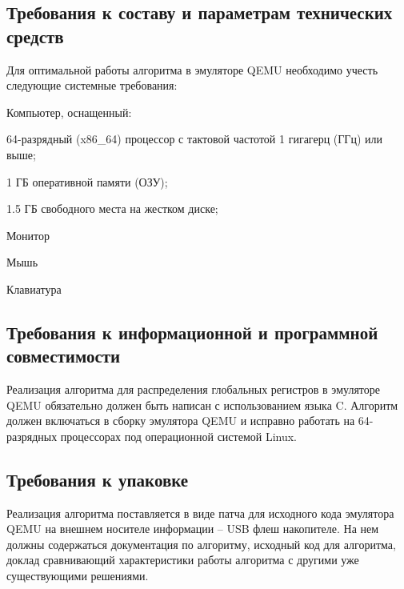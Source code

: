 \subsection{Требования к составу и параметрам технических средств}
Для оптимальной работы алгоритма в эмуляторе QEMU необходимо учесть следующие системные требования:
\begin{my_enumerate}
\item Компьютер, оснащенный:
    \begin{my_enumerate}
    \item 64-разрядный (x86\_64) процессор с тактовой частотой 1 гигагерц (ГГц) или выше;
    \item 1 ГБ оперативной памяти (ОЗУ);
    \item 1.5 ГБ свободного места на жестком диске;
    \end{my_enumerate}
\item Монитор
\item Мышь
\item Клавиатура
\end{my_enumerate}


\subsection{Требования к информационной и программной совместимости}

Реализация алгоритма для распределения глобальных регистров в эмуляторе QEMU обязательно должен быть написан с использованием языка C. Алгоритм должен включаться в сборку эмулятора QEMU и исправно работать на 64-разрядных процессорах под операционной системой Linux.


\subsection{Требования к упаковке}
Реализация алгоритма поставляется в виде патча для исходного кода эмулятора QEMU на внешнем носителе информации – USB флеш накопителе. На нем должны содержаться документация по алгоритму, исходный код для алгоритма, доклад сравнивающий характеристики работы алгоритма с другими уже существующими решениями.
